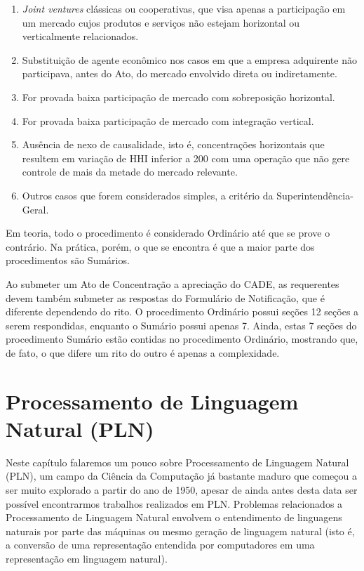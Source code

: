 \documentclass[11pt]{report}
\begin{document}
\begin{enumerate}[label=\textbf{\Roman*.}]
\item \textit{Joint ventures} clássicas ou cooperativas, que visa apenas a participação em um mercado cujos produtos e serviços não
estejam horizontal ou verticalmente relacionados.
\item Substituição de agente econômico nos casos em que a empresa adquirente não participava, antes do Ato, do mercado envolvido direta ou indiretamente.
\item For provada baixa participação de mercado com sobreposição horizontal.
\item For provada baixa participação de mercado com integração vertical.
\item Ausência de nexo de causalidade, isto é, concentrações horizontais que resultem em variação de HHI inferior a 200 com uma operação que não gere controle de mais da
metade do mercado relevante.
\item Outros casos que forem considerados simples, a critério da Superintendência-Geral.
\end{enumerate}

Em teoria, todo o procedimento é considerado Ordinário até que se prove o contrário. Na prática, porém, o que se encontra é que a maior parte dos procedimentos são Sumários.

Ao submeter um Ato de Concentração a apreciação do CADE, as requerentes devem também submeter as respostas do Formulário de Notificação, que é diferente dependendo do rito.
O procedimento Ordinário possui seções 12 seções a serem respondidas, enquanto o Sumário possui apenas 7. Ainda, estas 7 seções do procedimento Sumário estão contidas no
procedimento Ordinário, mostrando que, de fato, o que difere um rito do outro é apenas a complexidade.

\pagebreak
\chapter{Processamento de Linguagem Natural (PLN)}

\indent\indent Neste capítulo falaremos um pouco sobre Processamento de Linguagem Natural (PLN), um campo da Ciência da Computação já bastante maduro que começou a ser muito
explorado a partir do ano de 1950, apesar de ainda antes desta data ser possível encontrarmos trabalhos realizados em PLN. Problemas relacionados a
Processamento de Linguagem Natural envolvem o entendimento de linguagens naturais por parte das máquinas ou mesmo geração de linguagem natural (isto é, a conversão
de uma representação entendida por computadores em uma representação em linguagem natural).
\end{document}
